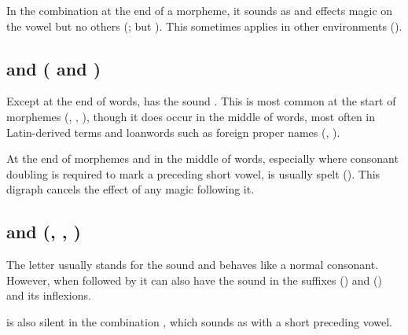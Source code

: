 In the combination  at the end of a morpheme, it sounds as  and
effects magic  on the vowel  but no others (; but
). This sometimes applies in other environments
().

\subsection{ and  ( and )}

Except at the end of words,  has the sound . This is most common at
the start of morphemes (, , ), though it does occur
in the middle of words, most often in Latin-derived terms and loanwords such as
foreign proper names (, ).

At the end of morphemes and in the middle of words, especially where consonant
doubling is required to mark a preceding short vowel,  is usually spelt
 (). This digraph cancels the effect of any magic 
following it.

\subsection{ and  (, , )}

The letter  usually stands for the sound  and behaves like a normal
consonant. However, when followed by  it can also have the sound  in
the suffixes  () and  () and its inflexions.

 is also silent in the combination , which sounds as  with
a short preceding vowel.
